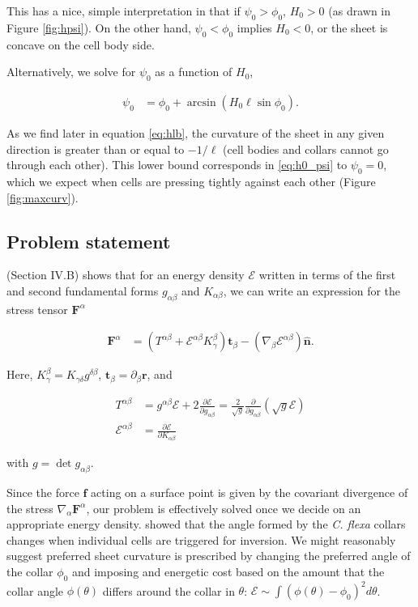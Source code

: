 \documentclass[draft]{article}
\newcommand{\e}{\mathcal{E}}
\begin{document}
This has a nice, simple interpretation in that if $\psi_0 > \phi_0$, $H_0 > 0$ (as drawn in Figure \ref{fig:hpsi}). On the other hand, $\psi_0 < \phi_0$ implies $H_0 < 0$, or the sheet is concave on the cell body side. 

Alternatively, we solve for $\psi_0$ as a function of $H_0$,

\begin{align}
    \psi_0 &= \phi_0 + \arcsin \left( H_0 \ell \sin \phi_0 \right). \label{eq:h0_psi}
\end{align}

As we find later in equation \ref{eq:hlb}, the curvature of the sheet in any given direction is greater than or equal to $-1/\ell$ (cell bodies and collars cannot go through each other). This lower bound corresponds in \ref{eq:h0_psi} to $\psi_0 = 0$, which we expect when cells are pressing tightly against each other (Figure \ref{fig:maxcurv}).


\subsection{Problem statement} \label{subsec:problem}

\textcite{powers2010} (Section IV.B) shows that for an energy density $\e$ written in terms of the first and second fundamental forms $g_{\alpha\beta}$ and $K_{\alpha\beta}$, we can write an expression for the stress tensor $\bm{F}^\alpha$ 

\begin{align}
    \bm{F}^\alpha &= \left(T^{\alpha\beta} + \e^{\alpha\beta}K_\gamma^\beta \right)\bm{t}_\beta - (\nabla_\beta \e^{\alpha\beta})\hat{\bm{n}}. \label{eq:stress}
\end{align}

\noindent Here, $K_\gamma^\beta = K_{\gamma \delta}g^{\delta \beta}$, $\bm{t}_\beta = \partial_\beta \bm{r}$, and 

\begin{align*}
    T^{\alpha\beta} &= g^{\alpha\beta} \e + 2 \frac{\partial \e}{\partial g_{\alpha\beta}} = \frac{2}{\sqrt{g}} \frac{\partial}{\partial g_{\alpha\beta}} \left(\sqrt{g}\e \right) \\
    \e^{\alpha\beta} &= \frac{\partial \e}{\partial K_{\alpha\beta}}
\end{align*}

\noindent with $g = \det{g_{\alpha\beta}}$.

Since the force $\bm{f}$ acting on a surface point is given by the covariant divergence of the stress $\nabla_\alpha \bm{F}^\alpha$, our problem is effectively solved once we decide on an appropriate energy density. \textcite{brunet2019} showed that the angle formed by the \textit{C. flexa} collars changes when individual cells are triggered for inversion. We might reasonably suggest preferred sheet curvature is prescribed by changing the preferred angle of the collar $\phi_0$ and imposing and energetic cost based on the amount that the collar angle $\phi(\theta)$ differs around the collar in $\theta$: $\e \sim \int (\phi(\theta) - \phi_0)^2 d\theta$.
\end{document}
